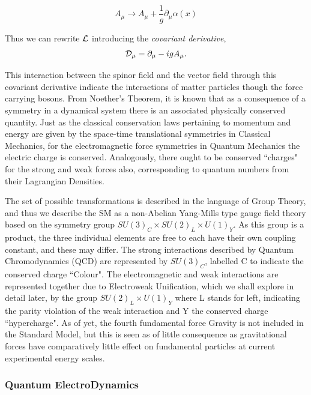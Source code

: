 \begin{equation}
A_{\mu} \rightarrow A_{\mu} + \frac{1}{g} \partial_{\mu} \alpha(x)
\label{ATrans}
\end{equation}

Thus we can rewrite ${\mathcal{L}}$ introducing the \textit{covariant derivative}, 
\begin{equation}
{\mathcal{D}}_{\mu} = \partial_{\mu} - igA_{\mu}. 
\end{equation}

This interaction between the spinor field and the vector field through this covariant derivative indicate the interactions of matter particles though the force carrying bosons. From Noether's Theorem, it is known that as a consequence of a symmetry in a dynamical system there is an associated physically conserved quantity\cite{Rolnick}. Just as the classical conservation laws pertaining to momentum and energy are given by the space-time translational symmetries in Classical Mechanics, for the electromagnetic force symmetries in Quantum Mechanics the electric charge is conserved. Analogously, there ought to be conserved ``charges" for the strong and weak forces also, corresponding to quantum numbers from their Lagrangian Densities. 
 
The set of possible transformations is described in the language of Group Theory, and thus we describe the SM as a non-Abelian Yang-Mills type gauge field theory based on the symmetry group $SU(3)_{C} \times SU(2)_{L} \times U(1)_{Y}$. As this group is a product, the three individual elements are free to each have their own coupling constant, and these may differ. The strong interactions described by Quantum Chromodynamics (QCD) are represented by $SU(3)_{C}$, labelled C to indicate the conserved charge ``Colour". The electromagnetic and weak interactions are represented together due to Electroweak Unification, which we shall explore in detail later, by the group $SU(2)_L \times U(1)_{Y}$ where L stands for left, indicating the parity violation of the weak interaction and Y the conserved charge ``hypercharge". As of yet, the fourth fundamental force Gravity is not included in the Standard Model, but this is seen as of little consequence as gravitational forces have comparatively little effect on fundamental particles at current experimental energy scales. 

\subsubsection{Quantum ElectroDynamics}

